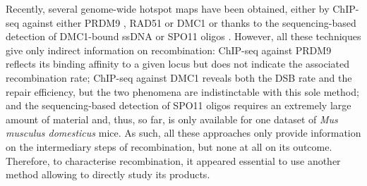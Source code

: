 Recently, several genome-wide hotspot maps have been obtained, either by ChIP-seq against either PRDM9 \citep{baker2015prdm9}, RAD51 or DMC1 \citep{smagulova2011genomewide} or thanks to the sequencing-based detection of DMC1-bound ssDNA \citep{khil2012sensitive, brick2012genetic} or SPO11 oligos \citep{lange2016landscape}.
However, all these techniques give only indirect information on recombination:
ChIP-seq against PRDM9 reflects its binding affinity to a given locus but does not indicate the associated recombination rate;
ChIP-seq against DMC1 reveals both the DSB rate and the repair efficiency, but the two phenomena are indistinctable with this sole method;
and the sequencing-based detection of SPO11 oligos requires an extremely large amount of material and, thus, so far, is only available for one dataset of \textit{Mus musculus domesticus} mice.
As such, all these approaches only provide information on the intermediary steps of recombination, but none at all on its outcome.
Therefore, to characterise recombination, it appeared essential to use another method allowing to directly study its products.\\


%



